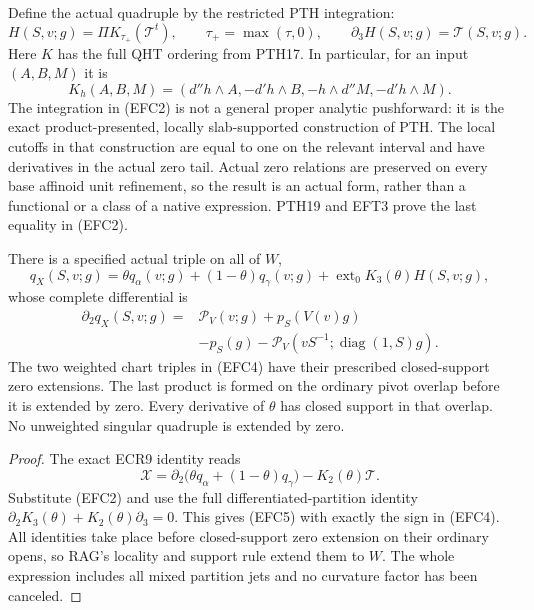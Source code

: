 Define the actual quadruple by the restricted PTH integration:
\[
 H(S,v;g)=\Pi K_{\tau_+}(\mathcal T^t),\qquad
 \tau_+=\max(\tau,0),
 \qquad \partial_3H(S,v;g)=\mathcal T(S,v;g).
 \tag{EFC2}
\]
Here $K$ has the full QHT ordering from PTH17.  In particular, for
an input $(A,B,M)$ it is
\[
 K_h(A,B,M)
   =(d''h\wedge A,-d'h\wedge B,-h\wedge d''M,-d'h\wedge M).
 \tag{EFC3}
\]
The integration in (EFC2) is not a general proper analytic
pushforward: it is the exact product-presented, locally
slab-supported construction of PTH.  The local cutoffs in that
construction are equal to one on the relevant interval and have
derivatives in the actual zero tail.  Actual zero relations are
preserved on every base affinoid unit refinement, so the result is
an actual form, rather than a functional or a class of a native
expression.  PTH19 and EFT3 prove the last equality in (EFC2).

\begin{theorem}
There is a specified actual triple on all of $W$,
\[
 q_X(S,v;g)=\theta q_\alpha(v;g)+(1-\theta)q_\gamma(v;g)
                   +\operatorname{ext}_0 K_3(\theta)H(S,v;g),
 \tag{EFC4}
\]
whose complete differential is
\[
 \begin{split}
 \partial_2q_X(S,v;g)={}&\mathcal P_V(v;g)+p_S(V(v)g)\\
 &-p_S(g)-\mathcal P_V(vS^{-1};\operatorname{diag}(1,S)g).
 \end{split}
 \tag{EFC5}
\]
The two weighted chart triples in (EFC4) have their prescribed
closed-support zero extensions.  The last product is formed on
the ordinary pivot overlap before it is extended by zero.  Every
derivative of $\theta$ has closed support in that overlap.
No unweighted singular quadruple is extended by zero.
\end{theorem}

\begin{proof}
The exact ECR9 identity reads
\[
 \mathcal X=\partial_2\bigl(\theta q_\alpha+(1-\theta)q_\gamma\bigr)
                      -K_2(\theta)\mathcal T.
\]
Substitute (EFC2) and use the full differentiated-partition identity
$\partial_2K_3(\theta)+K_2(\theta)\partial_3=0$.
This gives (EFC5) with exactly the sign in (EFC4).
All identities take place before closed-support zero extension on
their ordinary opens, so RAG's locality and support rule extend
them to $W$.  The whole expression includes all mixed partition
jets and no curvature factor has been canceled.
\end{proof}

